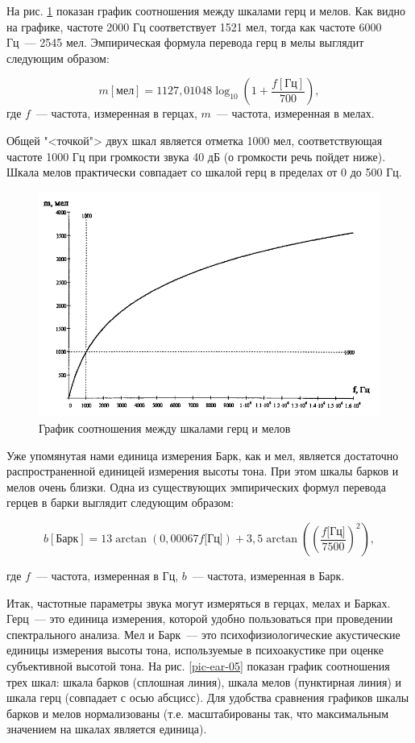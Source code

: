 \documentclass[oneside, final, 14pt]{extreport}
\begin{document}
На рис. \ref{pic-ear-04} показан график соотношения между шкалами герц и мелов. Как видно на графике, частоте 2000 Гц соответствует 1521 мел, тогда как частоте 6000 Гц~--- 2545 мел. Эмпирическая формула перевода герц в мелы выглядит следующим образом:

\[ m[\text{мел}]=1127,01048 \log_{10}(1+\frac{f[\text{Гц}]}{700}),\]
где \(f\)~--- частота, измеренная в герцах, \(m\)~--- частота, измеренная в мелах.

Общей "<точкой"> двух шкал является отметка 1000 мел, соответствующая частоте 1000 Гц при громкости звука 40 дБ (о громкости речь пойдет ниже). Шкала мелов практически совпадает со шкалой герц в пределах от 0 до 500 Гц.

\begin{figure}[h]
\centering
\includegraphics[scale=0.8]{pic-ear-04}
\caption{График соотношения между шкалами герц и мелов}
\label{pic-ear-04}
\end{figure}

Уже упомянутая нами единица измерения Барк, как и мел, является достаточно распространенной единицей измерения высоты тона. При этом шкалы барков и мелов очень близки. Одна из существующих эмпирических формул перевода герцев в барки выглядит следующим образом:

\[b [\text{Барк}]=13\arctan(0,00067f \text{[Гц]})+3,5\arctan((\frac{f \text{[Гц]}}{7500})^2),\]

где $f$~--- частота, измеренная в Гц, $b$~--- частота, измеренная в Барк.

Итак, частотные параметры звука могут измеряться в герцах, мелах и Барках. Герц~--- это единица измерения, которой удобно пользоваться при проведении спектрального анализа. Мел и Барк~--- это психофизиологические акустические единицы измерения высоты тона, используемые в психоакустике при оценке субъективной высотой тона. На рис. \ref{pic-ear-05} показан график соотношения трех шкал: шкала барков (сплошная линия), шкала мелов (пунктирная линия) и шкала герц (совпадает с осью абсцисс). Для удобства сравнения графиков шкалы барков и мелов нормализованы (т.е. масштабированы так, что максимальным значением на шкалах является единица).
\end{document}
